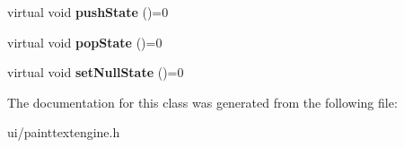 \begin{DoxyCompactItemize}
\item 
\hypertarget{class_tempest_1_1_paint_text_engine_afa3dd2fcd3f068b9e8bae5c7361074f4}{virtual void {\bfseries push\+State} ()=0}\label{class_tempest_1_1_paint_text_engine_afa3dd2fcd3f068b9e8bae5c7361074f4}

\item 
\hypertarget{class_tempest_1_1_paint_text_engine_a2b09e638f1ff353ac4943a89e12b13b7}{virtual void {\bfseries pop\+State} ()=0}\label{class_tempest_1_1_paint_text_engine_a2b09e638f1ff353ac4943a89e12b13b7}

\item 
\hypertarget{class_tempest_1_1_paint_text_engine_af7357b24f278b745d05560da5670667a}{virtual void {\bfseries set\+Null\+State} ()=0}\label{class_tempest_1_1_paint_text_engine_af7357b24f278b745d05560da5670667a}

\end{DoxyCompactItemize}


The documentation for this class was generated from the following file\+:\begin{DoxyCompactItemize}
\item 
ui/painttextengine.\+h\end{DoxyCompactItemize}
